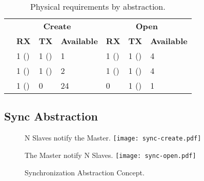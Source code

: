			\begin{table}[!tb]
				\centering%
				\caption{Physical requirements by abstraction.}%
				\label{tab.abstractions-amount}%

				\begin{tabular}{l|l|l|l|l|l|l|}
					\cline{2-7}
															& \multicolumn{3}{c|}{\textbf{Create}}  & \multicolumn{3}{c|}{\textbf{Open}}                              \\ \cline{2-7}
															& \multicolumn{1}{|c|}{\textbf{RX}}
															            & \multicolumn{1}{|c|}{\textbf{TX}}
																		            & \multicolumn{1}{|c|}{\textbf{Available}}
																					                & \multicolumn{1}{|c|}{\textbf{RX}}
																							                    & \multicolumn{1}{|c|}{\textbf{TX}}
																							        			            & \multicolumn{1}{|c|}{\textbf{Available}} \\ \hline
					\multicolumn{1}{|l|}{\textbf{\mailbox}} & 1 (\dnoc) & 1 (\cnoc) & 1             & 1 (\cnoc) & 1 (\dnoc) & 4                                        \\ \hline
					\multicolumn{1}{|l|}{\textbf{\portal}}  & 1 (\dnoc) & 1 (\cnoc) & 2             & 1 (\cnoc) & 1 (\dnoc) & 4                                        \\ \hline
					\multicolumn{1}{|l|}{\textbf{\sync}}    & 1 (\cnoc) & 0         & 24            & 0         & 1 (\cnoc) & 1                                        \\ \hline
				\end{tabular}

			\end{table}

		\subsection{Sync Abstraction}
		\label{sec.sync-abs}

			\begin{figure}[!tb]
				\centering%
				\caption{Synchronization Abstraction Concept.}%
				\label{fig:conpt_sync}%

					{N Slaves notify the Master.}%
					{\texttt{[image: sync-create.pdf]}}%

				\hfill

					{The Master notify N Slaves.}%
					{\texttt{[image: sync-open.pdf]}}%

			\end{figure}

